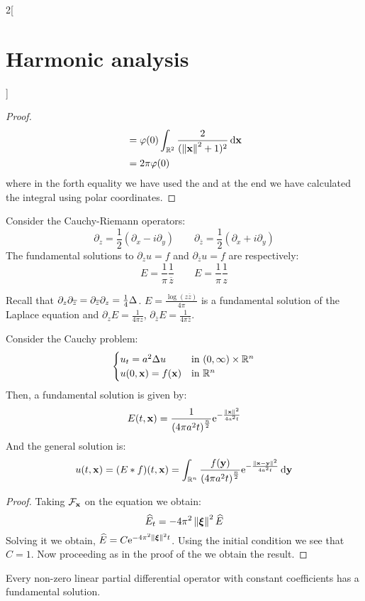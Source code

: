 \documentclass[../../../main_math.tex]{subfiles}
\begin{document}
\begin{multicols}{2}[\section{Harmonic analysis}]
\begin{proof}
\begin{align*}
                                                         & =\varphi(0)\int_{\mathbb{R}^2}\frac{2}{(\left\|\boldsymbol{\mathrm{x}}\right\|^2+1)^2}\dd{\boldsymbol{\mathrm{x}}}                               \\
                                                         & =2\pi\varphi(0)
    \end{align*}
    where in the forth equality we have used the  and at the end we have calculated the integral using polar coordinates.
  \end{proof}
  \begin{corollary}
    Consider the Cauchy-Riemann operators:
    $$
      \partial_z=\frac{1}{2}\left(\partial_x-i\partial_y\right)\qquad \partial_{\overline{z}}=\frac{1}{2}\left(\partial_x+i\partial_y\right)
    $$
    The fundamental solutions to $\partial_zu=f$ and $\partial_{\overline{z}}u=f$ are respectively:
    $$
      E=\frac{1}{\pi}\frac{1}{\overline{z}}\qquad E=\frac{1}{\pi}\frac{1}{z}
    $$
  \end{corollary}
  \begin{sproof}
    Recall that $\partial_z\partial_{\overline{z}}=\partial_{\overline{z}}\partial_z=\frac{1}{4}\Delta$. $E=\frac{\log(z\overline{z})}{4\pi}$ is a fundamental solution of the Laplace equation and $\partial_z E=\frac{1}{4\pi z}$, $\partial_{\overline{z}} E=\frac{1}{4\pi \overline{z}}$.
  \end{sproof}
  \begin{proposition}
    Consider the Cauchy problem:
    $$
      \begin{cases}
        u_t=a^2\Delta u   & \text{in }(0,\infty)\times\mathbb{R}^n \\
        u(0,\boldsymbol{\mathrm{x}})=f(\boldsymbol{\mathrm{x}}) & \text{in }\mathbb{R}^n
      \end{cases}
    $$
    Then, a fundamental solution is given by:
    $$
      E(t,\boldsymbol{\mathrm{x}})=\frac{1}{{(4\pi a^2t)}^{\frac{n}{2}}}\mathrm{e}^{-\frac{\left\|\boldsymbol{\mathrm{x}}\right\|^2}{4a^2t}}
    $$
    And the general solution is:
    $$
      u(t,\boldsymbol{\mathrm{x}})=(E*f)(t,\boldsymbol{\mathrm{x}})=\int_{\mathbb{R}^n} \frac{f(\boldsymbol{\mathrm{y}})}{{(4\pi a^2t)}^{\frac{n}{2}}}\mathrm{e}^{-\frac{\left\|\boldsymbol{\mathrm{x}}-\boldsymbol{\mathrm{y}}\right\|^2}{4a^2t}}\dd{\boldsymbol{\mathrm{y}}}
    $$
  \end{proposition}
  \begin{proof}
    Taking $\mathcal{F}_{\boldsymbol{\mathrm{x}}}$ on the equation we obtain:
    $$
      \widehat{E}_t=-4\pi^2\left\|\boldsymbol{\mathrm{\xi}}\right\|^2\widehat{E}
    $$
    Solving it we obtain, $\widehat{E}=C\mathrm{e}^{-4\pi^2\left\|\boldsymbol{\mathrm{\xi}}\right\|^2t}$. Using the initial condition we see that $C=1$. Now proceeding as in the proof of the  we obtain the result.
  \end{proof}
  \begin{theorem}
    Every non-zero linear partial differential operator with constant coefficients has a fundamental solution.
  \end{theorem}

\end{multicols}
\end{document}
